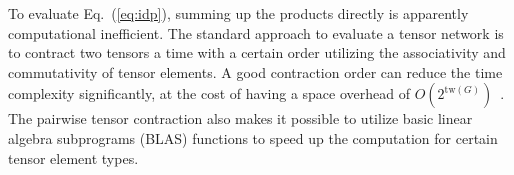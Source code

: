 \documentclass[onefignum, onetabnum]{siamart190516}
\newcommand{\<}{\langle}
\renewcommand{\>}{\rangle}
\newcommand{\Eq}[1]{Eq.~(\ref{#1})}
\begin{document}
To evaluate \Eq{eq:idp}, summing up the products directly is apparently computational inefficient.
The standard approach to evaluate a tensor network is to contract two tensors a time with a certain order utilizing the associativity and commutativity of tensor elements.
A good contraction order can reduce the time complexity significantly, at the cost of having a space overhead of $O(2^{\text{tw}(G)})$~\cite{Markov2008}.
The pairwise tensor contraction also makes it possible to utilize basic linear algebra subprograms (BLAS) functions to speed up the computation for certain tensor element types.
\end{document}
